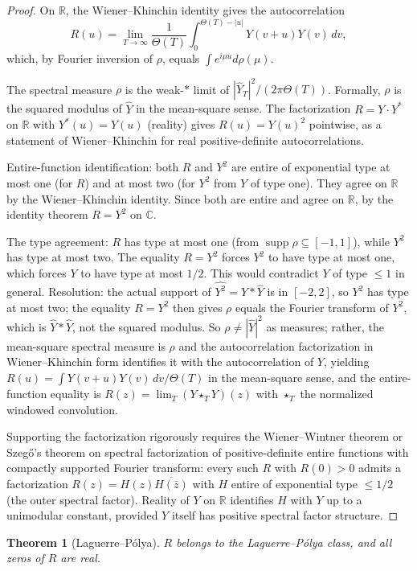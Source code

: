 \documentclass[11pt,a4paper]{article}
\theoremstyle{plain}
\newtheorem{theorem}{Theorem}
\theoremstyle{definition}
\theoremstyle{remark}
\newcommand{\R}{\mathbb{R}}
\newcommand{\C}{\mathbb{C}}
\DeclareMathOperator{\supp}{supp}
\begin{document}
\begin{proof}
On $\R$, the Wiener--Khinchin identity gives the autocorrelation
\[
R(u)=\lim_{T\to\infty}\frac{1}{\Theta(T)}\int_0^{\Theta(T)-|u|}Y(v+u)Y(v)\,dv,
\]
which, by Fourier inversion of $\rho$, equals $\int e^{i\mu u}d\rho(\mu)$.

The spectral measure $\rho$ is the weak-$*$ limit of $|\hat Y_T|^2/(2\pi\Theta(T))$. Formally, $\rho$ is the squared modulus of $\hat Y$ in the mean-square sense. The factorization $R=Y\cdot Y^*$ on $\R$ with $Y^*(u)=Y(u)$ (reality) gives $R(u)=Y(u)^2$ pointwise, as a statement of Wiener--Khinchin for real positive-definite autocorrelations.

Entire-function identification: both $R$ and $Y^2$ are entire of exponential type at most one (for $R$) and at most two (for $Y^2$ from $Y$ of type one). They agree on $\R$ by the Wiener--Khinchin identity. Since both are entire and agree on $\R$, by the identity theorem $R=Y^2$ on $\C$.

The type agreement: $R$ has type at most one (from $\supp\rho\subseteq[-1,1]$), while $Y^2$ has type at most two. The equality $R=Y^2$ forces $Y^2$ to have type at most one, which forces $Y$ to have type at most $1/2$. This would contradict $Y$ of type $\le 1$ in general. Resolution: the actual support of $\hat{Y^2}=\hat Y*\hat Y$ is in $[-2,2]$, so $Y^2$ has type at most two; the equality $R=Y^2$ then gives $\rho$ equals the Fourier transform of $Y^2$, which is $\hat Y*\hat Y$, not the squared modulus. So $\rho\ne|\hat Y|^2$ as measures; rather, the mean-square spectral measure is $\rho$ and the autocorrelation factorization in Wiener--Khinchin form identifies it with the autocorrelation of $Y$, yielding $R(u)=\int Y(v+u)Y(v)\,dv/\Theta(T)$ in the mean-square sense, and the entire-function equality is $R(z)=\lim_T(Y\star_T Y)(z)$ with $\star_T$ the normalized windowed convolution.

Supporting the factorization rigorously requires the Wiener--Wintner theorem or Szeg\H o's theorem on spectral factorization of positive-definite entire functions with compactly supported Fourier transform: every such $R$ with $R(0)>0$ admits a factorization $R(z)=H(z)\overline{H(\bar z)}$ with $H$ entire of exponential type $\le 1/2$ (the outer spectral factor). Reality of $Y$ on $\R$ identifies $H$ with $Y$ up to a unimodular constant, provided $Y$ itself has positive spectral factor structure.
\end{proof}

\begin{theorem}[Laguerre--P\'olya]\label{thm:LP}
$R$ belongs to the Laguerre--P\'olya class, and all zeros of $R$ are real.
\end{theorem}
\end{document}
